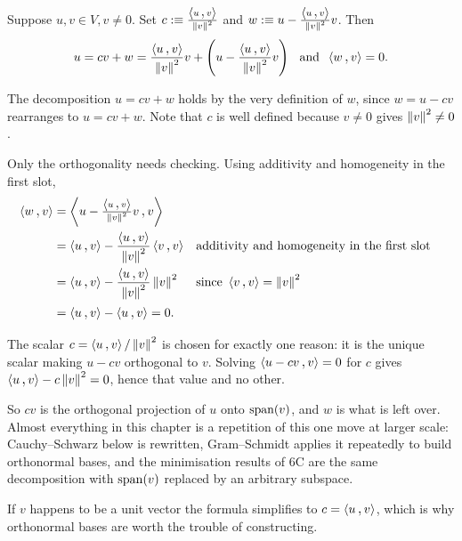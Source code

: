 \setcounter{thm}{12}
\begin{thm}
  \label{thm: an orthogonal decomposition}
  Suppose $u,v \in V, v\neq 0.$ Set $c :\equiv \frac{\ip{u}{v}}{\norm{v}^2}$ and $w :\equiv u-\frac{\ip{u}{v}}{\norm{v}^2}v$. Then
  \begin{equation}
    u = cv+w = \frac{\ip{u}{v}}{\norm{v}^2} v + \left( u- \frac{\ip{u}{v}}{\norm{v}^2} v \right  ) \myand \ip{w}{v}=0.
  \end{equation}
\end{thm}
\begin{prf}
  The decomposition $u = cv + w$ holds by the very definition of $w$, since $w = u - cv$ rearranges to $u = cv + w$. Note that $c$ is well defined because $v \neq 0$ gives $\left \lVert v \right \rVert^2 \neq 0$.

  Only the orthogonality needs checking. Using additivity and homogeneity in the first slot,
  \begin{equation}
    \begin{aligned}
      \ip{w}{v}
      &= \ip{u - \tfrac{\ip{u}{v}}{\norm{v}^2} v}{v} \\
      &= \ip{u}{v} - \frac{\ip{u}{v}}{\norm{v}^2} \ip{v}{v}
      &&\text{additivity and homogeneity in the first slot} \\
      &= \ip{u}{v} - \frac{\ip{u}{v}}{\norm{v}^2} \norm{v}^2
      &&\text{since } \ip{v}{v} = \norm{v}^2 \\
      &= \ip{u}{v} - \ip{u}{v} = 0.
    \end{aligned}
  \end{equation}
\end{prf}

\begin{ainote}
  The scalar $c = \ip{u}{v} / \norm{v}^2$ is chosen for exactly one reason: it is the unique scalar making $u - cv$ orthogonal to $v$. Solving $\ip{u - cv}{v} = 0$ for $c$ gives $\ip{u}{v} - c\norm{v}^2 = 0$, hence that value and no other.

  So $cv$ is the orthogonal projection of $u$ onto $\operatorname{span} (v)$, and $w$ is what is left over. Almost everything in this chapter is a repetition of this one move at larger scale: Cauchy--Schwarz below is  rewritten, Gram--Schmidt applies it repeatedly to build orthonormal bases, and the minimisation results of 6C are the same decomposition with $\operatorname{span} (v)$ replaced by an arbitrary subspace.

  If $v$ happens to be a unit vector the formula simplifies to $c = \ip{u}{v}$, which is why orthonormal bases are worth the trouble of constructing.
\end{ainote}

